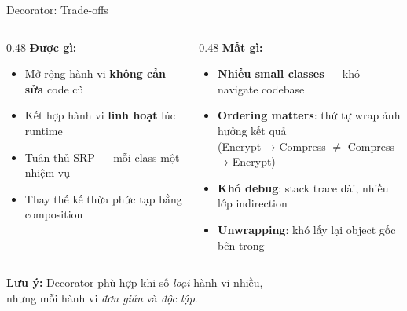 \begin{frame}{Decorator: Trade-offs}
  \begin{columns}[T]
    \begin{column}{0.48\textwidth}
      \textcolor{mygreen}{\textbf{Được gì:}}
      \begin{itemize}
        \item Mở rộng hành vi \textbf{không cần sửa} code cũ
        \item Kết hợp hành vi \textbf{linh hoạt} lúc runtime
        \item Tuân thủ SRP --- mỗi class một nhiệm vụ
        \item Thay thế kế thừa phức tạp bằng composition
      \end{itemize}
    \end{column}
    \begin{column}{0.48\textwidth}
      \textcolor{myred}{\textbf{Mất gì:}}
      \begin{itemize}
        \item \textbf{Nhiều small classes} --- khó navigate codebase
        \item \textbf{Ordering matters}: thứ tự wrap ảnh hưởng kết quả\\
              {\footnotesize (Encrypt → Compress $\neq$ Compress → Encrypt)}
        \item \textbf{Khó debug}: stack trace dài, nhiều lớp indirection
        \item \textbf{Unwrapping}: khó lấy lại object gốc bên trong
      \end{itemize}
    \end{column}
  \end{columns}

  \vspace{0.5em}
  \centering
  \textcolor{myorange}{\textbf{Lưu ý:}} Decorator phù hợp khi số \textit{loại} hành vi nhiều,\\
  nhưng mỗi hành vi \textit{đơn giản} và \textit{độc lập}.
\end{frame}

